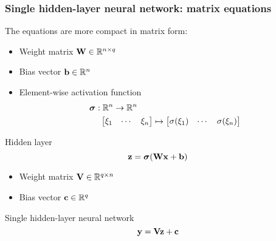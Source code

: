 \begin{frame}
    \frametitle{Single hidden-layer neural network: matrix equations}

    The equations are more compact in matrix form:
    \begin{itemize}
        \item Weight matrix $\mathbf{W} \in \mathbb{R}^{n \times q}$
        \item Bias vector $\mathbf{b} \in \mathbb{R}^n$
        \item Element-wise activation function
        \begin{align*}
            \bm{\sigma} &: \mathbb{R}^n \to \mathbb{R}^n \\
            &\hspace{1.25ex} \begin{bmatrix} \xi_1 & \cdots & \xi_n \end{bmatrix} \mapsto
            \begin{bmatrix} \sigma(\xi_1) & \cdots & \sigma(\xi_n) \end{bmatrix}
        \end{align*}
    \end{itemize}

    \begin{block}{Hidden layer}
        \begin{equation*}
            \mathbf{z} = \bm{\sigma}(\mathbf{W} \mathbf{x} + \mathbf{b})
        \end{equation*}
    \end{block}
    \pause

    \begin{itemize}
        \item Weight matrix $\mathbf{V} \in \mathbb{R}^{q \times n}$
        \item Bias vector $\mathbf{c} \in \mathbb{R}^q$
    \end{itemize}

    \begin{block}{Single hidden-layer neural network}
        \begin{equation*}
            \mathbf{y} = \mathbf{V} \mathbf{z} + \mathbf{c}
        \end{equation*}
    \end{block}
\end{frame}


